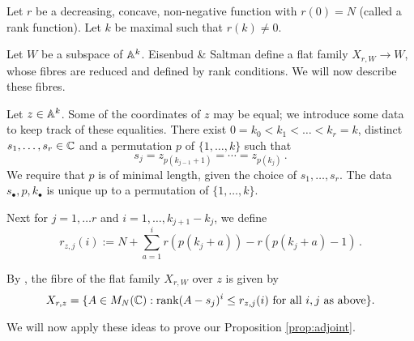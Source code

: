 \documentclass[draft]{article}
\begin{document}
Let $ r $ be a decreasing, concave, non-negative function with $r(0) = N$ (called a rank function).  Let $k $ be maximal such that $ r(k) \ne 0 $.
  

Let $ W$ be a subspace of $ \AA^k$. Eisenbud \& Saltman define a flat family $ X_{r,W} \rightarrow W$, whose fibres are reduced and defined by rank conditions. We will now describe these fibres.

Let $ z \in \AA^k$. Some of the coordinates of $z$ may be equal; we introduce some data to keep track of these equalities. There exist $ 0=k_0< k_1< \dots < k_r = k $, distinct $ s_1, \dots, s_r \in \CC$ and a permutation  $ p $ of $ \{1, \dots, k\}$ such that 
$$ s_j = z_{p(k_{j-1}+1)} = \cdots = z_{p(k_j)}\,. $$ We require that $ p $ is of minimal length, given the choice of $ s_1, \dots, s_r$.  The data $s_\bullet, p, k_\bullet$ is unique up to a permutation of $ \{1, \dots, k\}$.



Next for $ j = 1, \dots r $ and $ i = 1, \dots, k_{j+1} - k_j$, we define
$$
    r_{z,j}(i):= N + \sum_{a = 1}^i r(p(k_j + a)) - r(p(k_j +a) - 1)  \, . 
$$

% 
By \cite[Corollary 2.2]{eisenbud1989rank}, the fibre of the flat family $ X_{r,W} $ over $ z$ is given by
\begin{equation} \label{eq:ESfibre}
X_{r,z} = \{ A \in M_N(\CC) :\rk (A-s_j)^i\le r_{z,j}(i) \text{ for all } i , j \text{ as above}\}.
\end{equation}

We will now apply these ideas to prove our Proposition \ref{prop:adjoint}.
\end{document}
